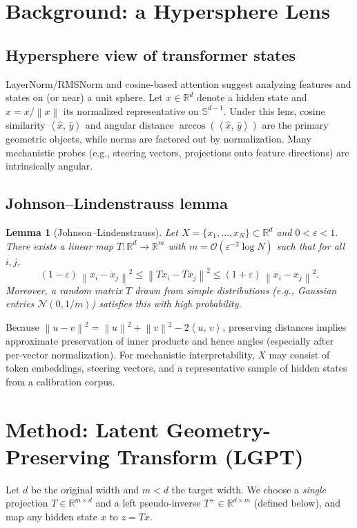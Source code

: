 \documentclass{article}
\newcommand{\R}{\mathbb{R}}
\newcommand{\norm}[1]{\left\lVert #1 \right\rVert}
\newcommand{\ip}[2]{\left\langle #1,\,#2 \right\rangle}
\newtheorem{lemma}{Lemma}
\begin{document}
\section{Background: a Hypersphere Lens}
\label{sec:background}
\subsection{Hypersphere view of transformer states}
LayerNorm/RMSNorm and cosine-based attention suggest analyzing features and states
on (or near) a unit sphere. Let $x\in\R^d$ denote a hidden state and
$\hat{x}=x/\norm{x}$ its normalized representative on $\mathbb{S}^{d-1}$. Under
this lens, cosine similarity $\ip{\hat{x}}{\hat{y}}$ and angular distance
$\arccos(\ip{\hat{x}}{\hat{y}})$ are the primary geometric objects, while norms
are factored out by normalization. Many mechanistic probes (e.g., steering vectors,
projections onto feature directions) are intrinsically angular.

\subsection{Johnson--Lindenstrauss lemma}
\label{ssec:jl}
\begin{lemma}[Johnson--Lindenstrauss]
\label{lem:jl}
Let $X=\{x_1,\dots,x_N\}\subset\R^d$ and $0<\varepsilon<1$. There exists a linear
map $T:\R^d\to\R^m$ with $m=\mathcal{O}(\varepsilon^{-2}\log N)$ such that for all
$i,j$,
\[
(1-\varepsilon)\,\norm{x_i-x_j}^2 \le \norm{T x_i - T x_j}^2
\le (1+\varepsilon)\,\norm{x_i-x_j}^2.
\]
Moreover, a random matrix $T$ drawn from simple distributions (e.g., Gaussian
entries $\mathcal{N}(0,1/m)$) satisfies this with high probability.
\end{lemma}
Because $\norm{u-v}^2=\norm{u}^2+\norm{v}^2-2\ip{u}{v}$, preserving distances
implies approximate preservation of inner products and hence angles (especially
after per-vector normalization). For mechanistic interpretability, $X$ may consist
of token embeddings, steering vectors, and a representative sample of hidden
states from a calibration corpus.

\section{Method: Latent Geometry-Preserving Transform (LGPT)}
\label{sec:method}
Let $d$ be the original width and $m<d$ the target width. We choose a \emph{single}
projection $T\in\R^{m\times d}$ and a left pseudo-inverse $T^+\in\R^{d\times m}$
(defined below), and map any hidden state $x$ to $z=Tx$.
\end{document}
